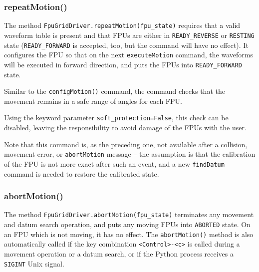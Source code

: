 \documentclass[11pt,a4paper]{scrartcl}
\begin{document}
\subsubsection{repeatMotion()}

\begin{sloppypar}
The method \texttt{FpuGridDriver.repeatMotion(fpu\_state)} requires
that a valid waveform table is present and that FPUs are either in
\texttt{READY\_REVERSE} or \texttt{RESTING} state
(\texttt{READY\_FORWARD} is accepted, too, but the command will have
no effect). It configures the FPU so that on the next
\texttt{executeMotion} command, the waveforms will be executed in
forward direction, and puts the FPUs into \texttt{READY\_FORWARD}
state. 
\end{sloppypar}

Similar to the \texttt{configMotion()} command, the command checks
that the movement remains in a safe range of angles for each
FPU.

Using the keyword parameter \texttt{soft\_protection=False}, this
check can be disabled, leaving the responsibility to avoid damage of
the FPUs with the user.

Note that this command is, as the preceding one, not available after a
collision, movement error, or \texttt{abortMotion} message -- the
assumption is that the calibration of the FPU is not more exact after
such an event, and a new \texttt{findDatum} command is needed to
restore the calibrated state.


\subsubsection{abortMotion()}


\begin{sloppypar}
The method \texttt{FpuGridDriver.abortMotion(fpu\_state)} terminates
any movement and datum search operation, and puts any moving FPUs into
\texttt{ABORTED} state. On an FPU which is not moving, it has no
effect.  The \texttt{abortMotion()} method is also automatically
called if the key combination \verb+<Control>-<c>+ is called during a
movement operation or a datum search, or if the Python process
receives a \texttt{SIGINT} Unix signal.
\end{sloppypar}
\end{document}
